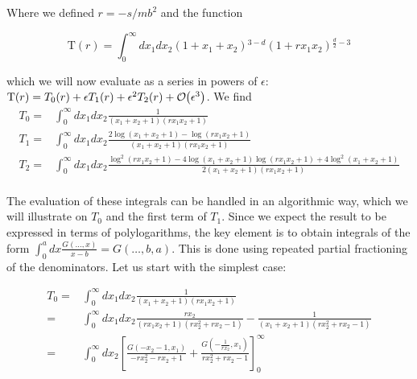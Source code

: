 Where we defined $r=-s/mb^2$ and the function

\begin{equation}
  \text{T}(r) = \int_0^\infty dx_1dx_2 \left(1+x_1+x_2\right){}^{3-d} \left(1+r x_1 x_2\right){}^{\frac{d}{2}-3}
\end{equation}

which we will now evaluate as a series in powers of $\epsilon$: $\text{T}(r)=T_0(r)+\epsilon T_1(r)+\epsilon^2 T_2(r)+{\cal O}\hspace{-0.2em}\left(\epsilon^3\right)$. We find
\begin{equation}
\renewcommand{\arraystretch}{2}
\begin{array}{rl}
 T_0=&\displaystyle\int_0^\infty dx_1dx_2\frac{1}{\left(x_1+x_2+1\right) \left(r x_1 x_2+1\right)} \\
 T_1=&\displaystyle\int_0^\infty dx_1dx_2\frac{2 \log \left(x_1+x_2+1\right)-\log \left(r x_1
   x_2+1\right)}{\left(x_1+x_2+1\right) \left(r x_1 x_2+1\right)} \\
 T_2=&\displaystyle\int_0^\infty dx_1dx_2\frac{\log ^2\left(r x_1 x_2+1\right)-4 \log \left(x_1+x_2+1\right) \log \left(r x_1
   x_2+1\right)+4 \log ^2\left(x_1+x_2+1\right)}{2 \left(x_1+x_2+1\right) \left(r x_1
   x_2+1\right)} \\
\end{array}
\end{equation}

The evaluation of these integrals can be handled in an algorithmic way, which we will illustrate on $T_0$ and the first term of $T_1$. Since we expect the result to be expressed in terms of polylogarithms, the key element is to obtain integrals of the form $\int_0^a dx \frac{G(\dots,x)}{x-b}=G(\dots,b,a)$. This is done using repeated partial fractioning of the denominators. Let us start with the simplest case:

\begin{equation}
\begin{split}
  T_0=&\displaystyle\int_0^\infty dx_1dx_2\frac{1}{\left(x_1+x_2+1\right) \left(r x_1 x_2+1\right)} \\
  =&\displaystyle\int_0^\infty dx_1dx_2 \frac{r x_2}{\left(r x_1 x_2+1\right) \left(r x_2^2+r
   x_2-1\right)}-\frac{1}{\left(x_1+x_2+1\right) \left(r x_2^2+r
   x_2-1\right)}\\
  =& \displaystyle\int_0^\infty dx_2 \left[ \frac{G\left(-x_2-1,x_1\right)}{-r x_2^2-r x_2+1}+\frac{G\left(-\frac{1}{r x_2},x_1\right)}{r x_2^2+r x_2-1}\right]^\infty_0
\end{split}
\end{equation}

